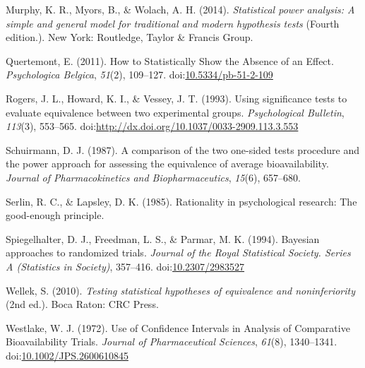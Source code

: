 \documentclass[,man,floatsintext]{apa6}
\begin{document}
\hypertarget{ref-murphy_statistical_2014}{}
Murphy, K. R., Myors, B., \& Wolach, A. H. (2014). \emph{Statistical
power analysis: A simple and general model for traditional and modern
hypothesis tests} (Fourth edition.). New York: Routledge, Taylor \&
Francis Group.

\hypertarget{ref-quertemont_how_2011}{}
Quertemont, E. (2011). How to Statistically Show the Absence of an
Effect. \emph{Psychologica Belgica}, \emph{51}(2), 109--127.
doi:\href{https://doi.org/10.5334/pb-51-2-109}{10.5334/pb-51-2-109}

\hypertarget{ref-rogers_using_1993}{}
Rogers, J. L., Howard, K. I., \& Vessey, J. T. (1993). Using
significance tests to evaluate equivalence between two experimental
groups. \emph{Psychological Bulletin}, \emph{113}(3), 553--565.
doi:\href{https://doi.org/http://dx.doi.org/10.1037/0033-2909.113.3.553}{http://dx.doi.org/10.1037/0033-2909.113.3.553}

\hypertarget{ref-schuirmann_comparison_1987}{}
Schuirmann, D. J. (1987). A comparison of the two one-sided tests
procedure and the power approach for assessing the equivalence of
average bioavailability. \emph{Journal of Pharmacokinetics and
Biopharmaceutics}, \emph{15}(6), 657--680.

\hypertarget{ref-serlin_rationality_1985}{}
Serlin, R. C., \& Lapsley, D. K. (1985). Rationality in psychological
research: The good-enough principle.

\hypertarget{ref-spiegelhalter_bayesian_1994}{}
Spiegelhalter, D. J., Freedman, L. S., \& Parmar, M. K. (1994). Bayesian
approaches to randomized trials. \emph{Journal of the Royal Statistical
Society. Series A (Statistics in Society)}, 357--416.
doi:\href{https://doi.org/10.2307/2983527}{10.2307/2983527}

\hypertarget{ref-wellek_testing_2010}{}
Wellek, S. (2010). \emph{Testing statistical hypotheses of equivalence
and noninferiority} (2nd ed.). Boca Raton: CRC Press.

\hypertarget{ref-westlake_use_1972}{}
Westlake, W. J. (1972). Use of Confidence Intervals in Analysis of
Comparative Bioavailability Trials. \emph{Journal of Pharmaceutical
Sciences}, \emph{61}(8), 1340--1341.
doi:\href{https://doi.org/10.1002/JPS.2600610845}{10.1002/JPS.2600610845}
\end{document}
